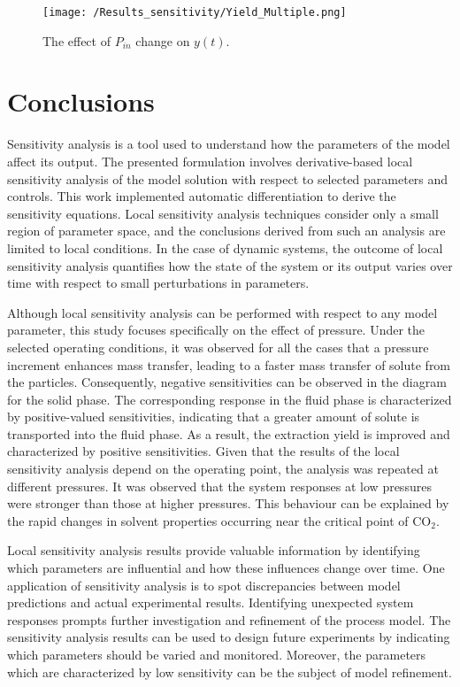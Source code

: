\documentclass[a4paper,fleqn]{cas-dc}
\begin{document}
	\begin{figure}[!ht]
		\centering
		\texttt{[image: /Results\_sensitivity/Yield\_Multiple.png]}
		\caption{The effect of $P_{in}$ change on $y(t)$.}
		\label{fig:Sensitivty_P_y}
	\end{figure}
	
	\section{Conclusions} \label{CH: Conclusion}
	
	Sensitivity analysis is a tool used to understand how the parameters of the model affect its output. The presented formulation involves derivative-based local sensitivity analysis of the model solution with respect to selected parameters and controls. This work implemented automatic differentiation to derive the sensitivity equations. Local sensitivity analysis techniques consider only a small region of parameter space, and the conclusions derived from such an analysis are limited to local conditions. In the case of dynamic systems, the outcome of local sensitivity analysis quantifies how the state of the system or its output varies over time with respect to small perturbations in parameters.
	
	Although local sensitivity analysis can be performed with respect to any model parameter, this study focuses specifically on the effect of pressure. Under the selected operating conditions, it was observed for all the cases that a pressure increment enhances mass transfer, leading to a faster mass transfer of solute from the particles. Consequently, negative sensitivities can be observed in the diagram for the solid phase. The corresponding response in the fluid phase is characterized by positive-valued sensitivities, indicating that a greater amount of solute is transported into the fluid phase. As a result, the extraction yield is improved and characterized by positive sensitivities. Given that the results of the local sensitivity analysis depend on the operating point, the analysis was repeated at different pressures. It was observed that the system responses at low pressures were stronger than those at higher pressures. This behaviour can be explained by the rapid changes in solvent properties occurring near the critical point of CO$_2$.
	
	Local sensitivity analysis results provide valuable information by identifying which parameters are influential and how these influences change over time. One application of sensitivity analysis is to spot discrepancies between model predictions and actual experimental results. Identifying unexpected system responses prompts further investigation and refinement of the process model.  The sensitivity analysis results can be used to design future experiments by indicating which parameters should be varied and monitored. Moreover, the parameters which are characterized by low sensitivity can be the subject of model refinement. 
	
\end{document}
